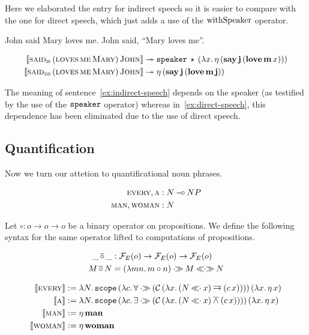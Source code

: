 \documentclass{llncs}
\begin{document}
Here we elaborated the entry for indirect speech so it is easier to compare
with the one for direct speech, which just adds a use of the $\operatorname{withSpeaker}$
operator.

\begin{exe}
  \ex John said Mary loves me. \label{ex:indirect-speech}
  \ex John said, ``Mary loves me''. \label{ex:direct-speech}
\end{exe}

\begin{align}
  \llbracket \textsc{said}_{\textsc{is}}\,(\textsc{loves}\,\textsc{me}\,\textsc{Mary})\,\textsc{John} \rrbracket
  & \twoheadrightarrow \mathtt{speaker}\,\star\,(\lambda x.\, \eta\,(\textbf{say}\,\textbf{j}\,(\textbf{love}\,\textbf{m}\,x))) \\
  \llbracket \textsc{said}_{\textsc{ds}}\,(\textsc{loves}\,\textsc{me}\,\textsc{Mary})\,\textsc{John} \rrbracket
  & \twoheadrightarrow \eta\,(\textbf{say}\,\textbf{j}\,(\textbf{love}\,\textbf{m}\,\textbf{j}))
\end{align}

The meaning of sentence~\eqref{ex:indirect-speech} depends on the speaker
(as testified by the use of the $\mathtt{speaker}$ operator) whereas
in~\eqref{ex:direct-speech}, this dependence has been eliminated due to the
use of direct speech.

\subsection{Quantification}
\label{ssec:quantification}

Now we turn our attetion to quantificational noun phrases.

\begin{align*}
  \textsc{every}, \textsc{a} &: N \mathbin{{-}\mkern-3.5mu{\circ}} NP \\
  \textsc{man}, \textsc{woman} &: N
\end{align*}

Let $\circ : o \to o \to o$ be a binary operator on propositions. We define
the following syntax for the same operator lifted to computations of propositions.

\begin{align*}
  \_ \mathop{\overline{\circ}} \_ &: \mathcal{F}_E(o) \to \mathcal{F}_E(o) \to \mathcal{F}_E(o) \\
  M \mathop{\overline{\circ}} N &= (\lambda m n.\, m \circ n) \mathbin{\cdot\!\!\gg} M \mathbin{\ll\!\!\cdot\!\!\gg} N
\end{align*}

\begin{align*}
  \lex{every}{\lam{N}{\app{\op{scope}}{(\lam{c}{\forall \apr
          (\ap{\CC}{(\lam{x}{(N \apl x) \dimpl (\ap{c}{x})})})})}{(\lam{x}{\etaE{x}})}}} \\
  \lex{a}{\lam{N}{\app{\op{scope}}{(\lam{c}{\exists \apr
          (\ap{\CC}{(\lam{x}{(N \apl x) \dand (\ap{c}{x})})})})}{(\lam{x}{\etaE{x}})}}} \\
  \lex{man}{\etaE{\obj{man}}} \\
  \lex{woman}{\etaE{\obj{woman}}}
\end{align*}
\end{document}
